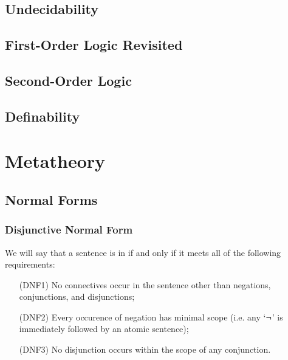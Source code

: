 \documentclass[12pt, a4paper, twoside, openright, titlepage]{book}
\begin{document}
\chapter{\textsection\textsection Undecidability}


\chapter{\textsection\textsection First-Order Logic Revisited}



\chapter{\textsection\textsection Second-Order Logic}



\chapter{\textsection\textsection Definability}




\part{Metatheory}


\chapter{\textsection\textsection Normal Forms}

\section{\textsection Disjunctive Normal Form}

\begin{defn}{}{}
    We will say that a sentence is in  if and only if it meets all of the following requirements: \begin{itemize}[leftmargin=+1in]
        \item[(DNF1)] No connectives occur in the sentence other than negations, conjunctions, and disjunctions;
        \item[(DNF2)] Every occurence of negation has minimal scope (i.e. any `$\neg$' is immediately followed by an atomic sentence);
        \item[(DNF3)] No disjunction occurs within the scope of any conjunction.
    \end{itemize}
\end{defn}
\end{document}

